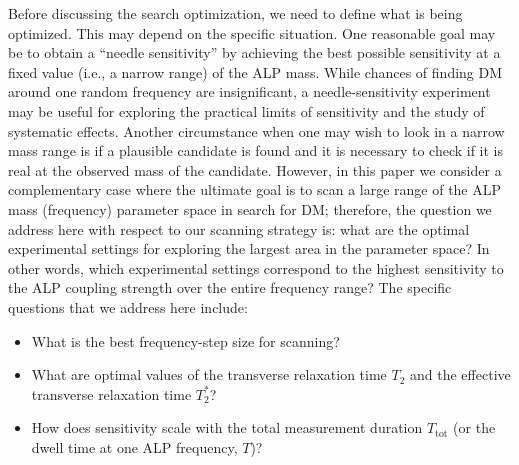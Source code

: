 Before discussing the search optimization, we need to define what is being optimized. This may depend on the specific situation. One reasonable goal may be to obtain a ``needle sensitivity'' by achieving the best possible sensitivity at a fixed value (i.e., a narrow range) of the ALP mass. While chances of finding DM around one random frequency are insignificant, a needle-sensitivity experiment may be useful for exploring the practical limits of sensitivity and the study of systematic effects. Another circumstance when one may wish to look in a narrow mass range is if a plausible candidate is found and it is necessary to check if it is real at the observed mass of the candidate. However, in this paper we consider a complementary case where the ultimate goal is to scan a large range of the ALP mass (frequency) parameter space in search for DM; therefore, the question we address here with respect to our scanning strategy is: 
what are the optimal experimental settings for exploring the largest area in the parameter space? In other words, which experimental settings correspond to the highest sensitivity to the ALP coupling strength over the entire frequency range? 
The specific questions that we address here include:
\begin{itemize}
    \item What is the best frequency-step size for scanning?
    \item What are optimal values of the transverse relaxation time $T_2$ and the effective transverse relaxation time $T_2^*$?
    \item How does sensitivity scale with the total measurement duration $T_{\mathrm{tot}}$ (or the dwell time at one ALP frequency, $T$)?
\end{itemize}


